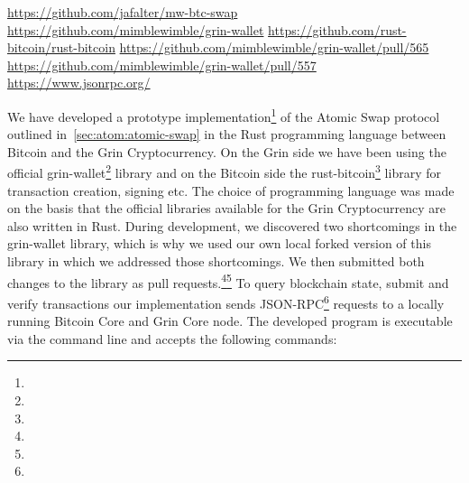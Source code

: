 \urldef\urlgithub\url{https://github.com/jafalter/mw-btc-swap}
\urldef\urlgrinwallet\url{https://github.com/mimblewimble/grin-wallet}
\urldef\urlrustbitcoin\url{https://github.com/rust-bitcoin/rust-bitcoin}
\urldef\urlprone\url{https://github.com/mimblewimble/grin-wallet/pull/565}
\urldef\urlprtwo\url{https://github.com/mimblewimble/grin-wallet/pull/557}
\urldef\urljsonrpc\url{https://www.jsonrpc.org/}

We have developed a prototype implementation\footnote{\urlgithub} of the Atomic Swap protocol outlined in~\cref{sec:atom:atomic-swap} in the Rust programming language between Bitcoin and the Grin Cryptocurrency.
On the Grin side we have been using the official grin-wallet\footnote{\urlgrinwallet} library and on the Bitcoin side the rust-bitcoin\footnote{\urlrustbitcoin} library for transaction creation, signing etc.
The choice of programming language was made on the basis that the official libraries available for the Grin Cryptocurrency are also written in Rust.
During development, we discovered two shortcomings in the grin-wallet library, which is why we used our own local forked version of this library in which we addressed those shortcomings.
We then submitted both changes to the library as pull requests.\footnote{\urlprone}\footnote{\urlprtwo}
To query blockchain state, submit and verify transactions our implementation sends JSON-RPC\footnote{\urljsonrpc} requests to a locally running Bitcoin Core and Grin Core node.
The developed program is executable via the command line and accepts the following commands:
